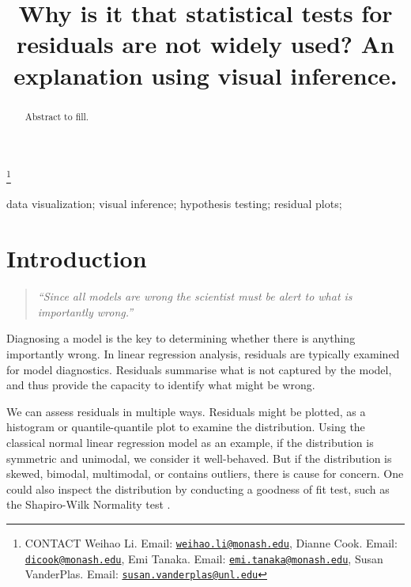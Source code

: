 \documentclass[]{interact}
\theoremstyle{plain}%
\theoremstyle{definition}
\theoremstyle{remark}
\begin{document}

\title{Why is it that statistical tests for residuals are not widely
used? An explanation using visual inference.}


\author{
}

\thanks{CONTACT Weihao
Li. Email: \href{mailto:weihao.li@monash.edu}{\nolinkurl{weihao.li@monash.edu}}, Dianne
Cook. Email: \href{mailto:dicook@monash.edu}{\nolinkurl{dicook@monash.edu}}, Emi
Tanaka. Email: \href{mailto:emi.tanaka@monash.edu}{\nolinkurl{emi.tanaka@monash.edu}}, Susan
VanderPlas. Email: \href{mailto:susan.vanderplas@unl.edu}{\nolinkurl{susan.vanderplas@unl.edu}}}

\maketitle

\begin{abstract}
Abstract to fill.
\end{abstract}

\begin{keywords}
data visualization; visual inference; hypothesis testing; residual
plots;
\end{keywords}

\hypertarget{introduction}{%
\section{Introduction}\label{introduction}}

\begin{quote}
\emph{``Since all models are wrong the scientist must be alert to what
is importantly wrong.''} \citep{box1976science}
\end{quote}

Diagnosing a model is the key to determining whether there is anything
importantly wrong. In linear regression analysis, residuals are
typically examined for model diagnostics. Residuals summarise what is
not captured by the model, and thus provide the capacity to identify
what might be wrong.

We can assess residuals in multiple ways. Residuals might be plotted, as
a histogram or quantile-quantile plot to examine the distribution. Using
the classical normal linear regression model as an example, if the
distribution is symmetric and unimodal, we consider it well-behaved. But
if the distribution is skewed, bimodal, multimodal, or contains
outliers, there is cause for concern. One could also inspect the
distribution by conducting a goodness of fit test, such as the
Shapiro-Wilk Normality test \citep{shapiro1965analysis}.
\end{document}
